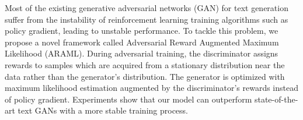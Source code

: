 Most of the existing generative adversarial networks (GAN) for text generation suffer from the instability of reinforcement learning training algorithms such as policy gradient, leading to unstable performance. To tackle this problem, we propose a novel framework called Adversarial Reward Augmented Maximum Likelihood (ARAML). During adversarial training, the discriminator assigns rewards to samples which are acquired from a stationary distribution near the data rather than the generator's distribution. The generator is optimized with maximum likelihood estimation augmented by the discriminator's rewards instead of policy gradient. Experiments show that our model can outperform state-of-the-art text GANs with a more stable training process.